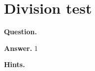 \documentclass{article}
\begin{document}
\section*{Division test}
\textbf{Question.} 

\textbf{Answer.} 1

\textbf{Hints.}
\begin{itemize}

\end{itemize}
\end{document}
